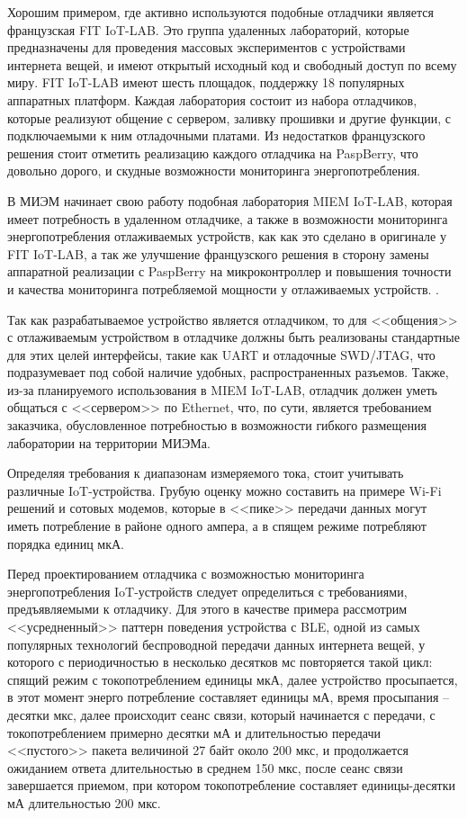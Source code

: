 Хорошим примером, где активно используются подобные отладчики является французская FIT IoT-LAB. 
Это группа удаленных лабораторий, которые предназначены для проведения массовых экспериментов 
с устройствами интернета вещей, и имеют открытый исходный код и свободный доступ по всему миру.
FIT IoT-LAB имеют шесть площадок, поддержку 18 популярных аппаратных платформ. 
Каждая лаборатория состоит из набора отладчиков, которые реализуют общение с сервером, заливку прошивки
и другие функции, с подключаемыми к ним отладочными платами. Из недостатков французского решения стоит 
отметить реализацию каждого отладчика на PaspBerry, что довольно дорого, и скудные возможности мониторинга 
энергопотребления.

В МИЭМ начинает свою работу подобная лаборатория MIEM IoT-LAB, которая имеет потребность в удаленном
отладчике, а также в возможности мониторинга энергопотребления отлаживаемых устройств, 
как как это сделано в оригинале у FIT IoT-LAB, а так же улучшение французского решения в сторону 
замены аппаратной реализации с PaspBerry на микроконтроллер и повышения 
точности и качества мониторинга потребляемой мощности у отлаживаемых устройств. \cite{FITIoT}.

Так как разрабатываемое устройство является отладчиком, то для <<общения>> с отлаживаемым устройством 
в отладчике должны быть реализованы стандартные для этих целей интерфейсы, такие как UART и отладочные 
SWD/JTAG, что подразумевает под собой наличие удобных, распространенных разъемов. Также, из-за планируемого 
использования в MIEM IoT-LAB, отладчик должен уметь общаться с <<сервером>> по Ethernet, что, по сути,
является требованием заказчика, обусловленное потребностью в возможности гибкого размещения лаборатории на 
территории МИЭМа.

Определяя требования к диапазонам измеряемого тока, стоит учитывать различные IoT-устройства. Грубую оценку
можно составить на примере Wi-Fi решений и сотовых модемов, которые в <<пике>> передачи данных могут 
иметь потребление в районе одного ампера, а в спящем режиме потребляют порядка единиц мкА.


Перед проектированием отладчика с возможностью мониторинга энергопотребления IoT-устройств
следует определиться с требованиями, предъявляемыми к отладчику. 
Для этого в качестве примера рассмотрим <<усредненный>> паттерн поведения устройства с BLE, одной
из самых популярных технологий беспроводной передачи данных интернета вещей, 
у которого с периодичностью в несколько десятков мс повторяется такой цикл: спящий режим 
с токопотреблением единицы мкА, далее устройство просыпается, в этот момент
энерго потребление составляет единицы мА, время просыпания -- десятки мкс, далее происходит
сеанс связи, который начинается с передачи, с токопотреблением примерно десятки мА 
и длительностью передачи <<пустого>> пакета величиной 27 байт около 200 мкс, и продолжается 
ожиданием ответа длительностью в среднем 150 мкс, после сеанс связи завершается приемом,
при котором токопотребление составляет единицы-десятки мА длительностью 200 мкс.

